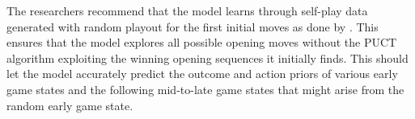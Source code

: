 The researchers recommend that the model learns through self-play data generated with random playout for the first initial moves as done by \cite{Popic_Boskovic_Brest_2021}. This ensures that the model explores all possible opening moves without the PUCT algorithm exploiting the winning opening sequences it initially finds. This should let the model accurately predict the outcome and action priors of various early game states and the following mid-to-late game states that might arise from the random early game state.

